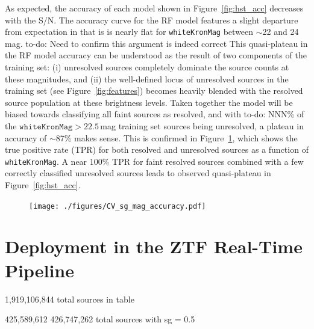 \documentclass[twocolumn]{aastex63}
\newcommand{\todo}[1]{{\color{magenta} to-do: {#1}}}
\begin{document}
As expected, the accuracy of each model shown in Figure~\ref{fig:hst_acc}
decreases with the S/N. The accuracy curve for the RF model features a slight
departure from expectation in that is is nearly flat for \texttt{whiteKronMag}
between $\sim$22 and 24\,mag. \todo{Need to confirm this argument is indeed
correct} This quasi-plateau in the RF model accuracy can be understood as the
result of two components of the training set: (i) unresolved sources
completely dominate the source counts at these magnitudes, and (ii) the
well-defined locus of unresolved sources in the training set (see
Figure~\ref{fig:features}) becomes heavily blended with the resolved source
population at these brightness levels. Taken together the model will be biased
towards classifying all faint sources as resolved, and with \todo{NNN}\% of
the $\mathtt{whiteKronMag} > 22.5$\,mag training set sources being unresolved,
a plateau in accuracy of $\sim$87\% makes sense. This is confirmed in
Figure~\ref{fig:sg_accuracy}, which shows the true positive rate (TPR) for
both resolved and unresolved sources as a function of \texttt{whiteKronMag}. A
near 100\% TPR for faint resolved sources combined with a few correctly
classified unresolved sources leads to observed quasi-plateau in
Figure~\ref{fig:hst_acc}.

\begin{figure}
    \centering
    \texttt{[image: ./figures/CV\_sg\_mag\_accuracy.pdf]}
    \caption{}
    \label{fig:sg_accuracy}
\end{figure}    

\section{Deployment in the ZTF Real-Time Pipeline}\label{sec:discussion}

1,919,106,844 total sources in table

425,589,612 
426,747,262 total sources with sg = 0.5

\acknowledgments

\vspace{5mm}
\facilities{}


\software{}

{}


\end{document}
